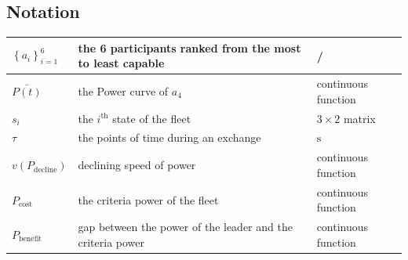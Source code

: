 \documentclass{article}
\begin{document}
		\subsection{Notation}
			\begin{tabular}{|l|l|l|}
				\hline
				\(\left\{ a_i \right\} _{i=1}^{6}\) & the 6 participants ranked from the most to least capable &/ \\
				\hline
				\(\bar{P\left( t \right) }\) & the Power curve of \(a_4\) & continuous function \\
				\hline
				\(s_i\) & the \(i^{\mathrm{th}}\) state of the fleet & \(3\times 2\) matrix \\
				\hline
				\(\tau\) & the points of time during an exchange & \(\mathrm{s}\)\\
				\hline
				$v(P_\mathrm{decline})$&declining speed of power& continuous function\\
				\hline
				$P_\mathrm{cost}$&the criteria power of the fleet& continuous function\\
				\hline
				$P_\mathrm{benefit}$&gap between the power of the leader and the criteria power& continuous function\\
				\hline
			\end{tabular}
\end{document}
